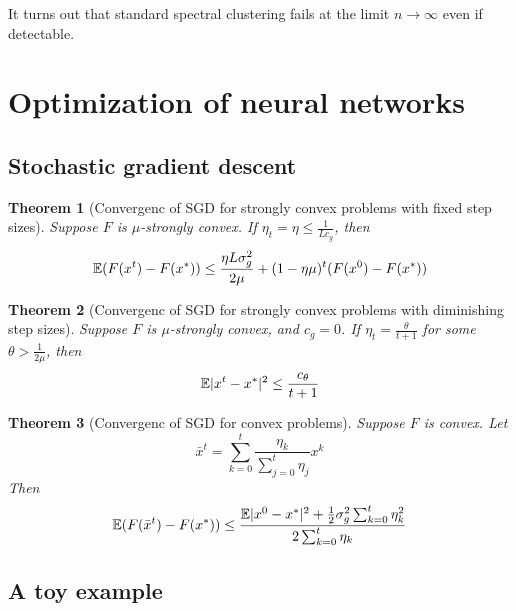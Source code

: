 \documentclass{article}
\newtheorem{theorem}{Theorem}
\begin{document}
It turns out that standard spectral clustering fails at the limit $n \rightarrow \infty$ even if detectable.

\section{Optimization of neural networks}

\subsection{Stochastic gradient descent}

\begin{theorem}[Convergenc of SGD for strongly convex problems with fixed step sizes]
Suppose $F$ is $\mu$-strongly convex.
If $\eta_t = \eta \leq \frac1{L c_g}$, then
\[
{\mathbb E} (F(x^t) - F(x^*)) \leq \frac{\eta L \sigma_g^2}{2 \mu} + (1 - \eta \mu)^t (F(x^0) - F(x^*))
\]
\end{theorem}

\begin{theorem}[Convergenc of SGD for strongly convex problems with diminishing step sizes]
Suppose $F$ is $\mu$-strongly convex, and $c_g = 0$.
If $\eta_t = \frac\theta{t + 1}$ for some $\theta > \frac1{2 \mu}$, then
\[
{\mathbb E} |x^t - x^*|^2 \leq \frac{c_\theta}{t + 1}
\]
\end{theorem}

\begin{theorem}[Convergenc of SGD for convex problems]
Suppose $F$ is convex.
Let
\[
\bar{x}^t = \sum_{k = 0}^t \frac{\eta_k}{\sum_{j = 0}^t \eta_j} x^k
\]
Then
\[
{\mathbb E} (F(\bar{x}^t) - F(x^*)) \leq \frac{{\mathbb E} |x^0 - x^*|^2 + \frac12 \sigma_g^2 \sum_{k = 0}^t \eta_k^2}{2 \sum_{k = 0}^t \eta_k}
\]
\end{theorem}

\subsection{A toy example}
\end{document}
